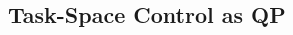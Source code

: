 \documentclass[a4paper, 8pt]{extarticle}
\begin{document}
\begin{multicols*}{3}

\subsection*{Task-Space Control as QP}


\end{multicols*}
\end{document}
